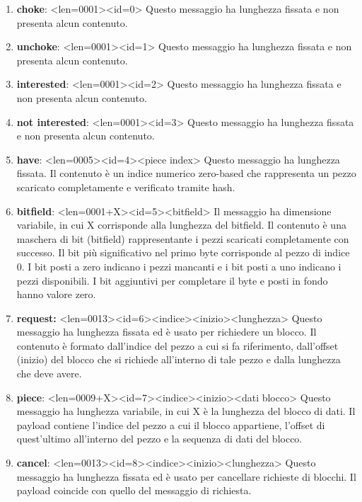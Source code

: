 \documentclass[a4]{book}
\begin{document}
\begin{enumerate}
	\item \textbf{choke}: <len=0001><id=0>\newline
	Questo messaggio ha lunghezza fissata e non presenta alcun contenuto.
	
	\item \textbf{unchoke}: <len=0001><id=1>\newline
	Questo messaggio ha lunghezza fissata e non presenta alcun contenuto.
	
	\item \textbf{interested}: <len=0001><id=2>\newline
	Questo messaggio ha lunghezza fissata e non presenta alcun contenuto. 
	
	\item \textbf{not interested}: <len=0001><id=3>\newline
	Questo messaggio ha lunghezza fissata e non presenta alcun contenuto.
	
	\item \textbf{have}: <len=0005><id=4><piece index>\newline
	Questo messaggio ha lunghezza fissata. Il contenuto è un indice numerico zero-based che rappresenta un pezzo scaricato completamente e verificato tramite hash. 
	
	\item \textbf{bitfield}: <len=0001+X><id=5><bitfield>\newline
	Il messaggio ha dimensione variabile, in cui X corrisponde alla lunghezza del bitfield. Il contenuto è una maschera di bit (bitfield) rappresentante i pezzi scaricati completamente con successo. Il bit più significativo nel primo byte corrisponde al pezzo di indice 0. I bit posti a zero indicano i pezzi mancanti e i bit posti a uno indicano i pezzi disponibili. I bit aggiuntivi per completare il byte e posti in fondo hanno valore zero.
	
	\item \textbf{request:} <len=0013><id=6><indice><inizio><lunghezza>\newline	
	Questo messaggio ha lunghezza fissata ed è usato per richiedere un blocco. Il contenuto è formato dall'indice del pezzo a cui si fa riferimento, dall'offset (inizio) del blocco che si richiede all'interno di tale pezzo e dalla lunghezza che deve avere.
	
	\item \textbf{piece}: <len=0009+X><id=7><indice><inizio><dati blocco>	
	Questo messaggio ha lunghezza variabile, in cui X è la lunghezza del blocco di dati. Il payload contiene l'indice del pezzo a cui il blocco appartiene, l'offset di quest'ultimo all'interno del pezzo e la sequenza di dati del blocco.
	
	\item \textbf{cancel}: <len=0013><id=8><indice><inizio><lunghezza>
	Questo messaggio ha lunghezza fissata ed è usato per cancellare richieste di blocchi. Il payload coincide con quello del messaggio di richiesta.\newline
\end{enumerate}
\end{document}
